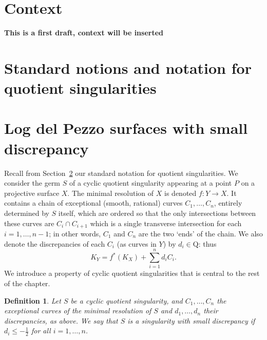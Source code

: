 \documentclass[11pt]{amsbook}
\theoremstyle{plain}
\newtheorem{dfn}[thm]{Definition}
\newcommand{\Q}{\mathrm{Q}}
\begin{document}
 

\setcounter{chapter}{2}

\section{Context}

\textbf{This is a first draft, context will be inserted}

\section{Standard notions and notation for quotient singularities}
\label{sec!notation}

\section{Log del Pezzo surfaces with small discrepancy}

Recall from Section~\ref{sec!notation} our standard notation for quotient singularities.
We consider the germ $S$ of a cyclic quotient singularity appearing at a point $P$ on a 
projective surface $X$.
The minimal resolution of $X$ is denoted $f\colon Y \longrightarrow X$. It contains a chain of
exceptional (smooth, rational)
curves $C_1,\dots,C_n$, entirely determined by $S$ itself, which are ordered so
that the only intersections between these curves are
$C_i\cap C_{i+1}$ which is a single transverse intersection for each $i=1,\dots,n-1$; 
in other words,
$C_1$ and $C_n$ are the two `ends' of the chain.
We also denote the discrepancies of each $C_i$ (as curves in $Y$) by $d_i\in\Q$: thus
\[
K_Y = f^*(K_X) + \sum_{i=1}^n d_i C_i.
\]
We introduce a property of cyclic quotient singularities that is central to the rest of the chapter.
\begin{dfn}
Let $S$ be a cyclic quotient singularity, and $C_1, \dots ,C_n$ the exceptional curves of the minimal resolution of $S$ and $d_1, \dots,d_n$ their discrepancies, as above.
We say that $S$ is a \emph{singularity with small discrepancy} if $d_i \leq -\frac{1}{2}$ for
all $i=1,\dots,n$.
\end{dfn}
\end{document}

